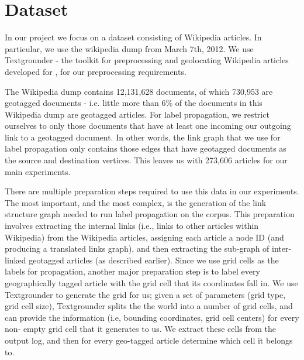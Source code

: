 
\section{Dataset} 
\par In our project we focus on a dataset consisting of
Wikipedia articles. In particular, we use the wikipedia dump from March
7th, 2012. We use Textgrounder - the toolkit for preprocessing and geolocating
Wikipedia articles developed for \cite{wing-baldridge:11}, for our
preprocessing requirements.

\par The Wikipedia dump contains 12,131,628 documents,  of which 730,953 are geotagged documents -
i.e. little more than 6\% of the documents in this Wikipedia dump are
geotagged articles.  For label propagation, we restrict ourselves to only
those documents that have at least one incoming our outgoing link to a
geotagged document. In other words, the link graph that we use for label
propagation only contains those edges that have geotagged documents as the
source and destination vertices. This leaves us with 273,606 articles for our
main experiments.

\par There are multiple preparation steps required to use this data in our
experiments. The most important, and the most complex, is the generation of
the  link structure graph needed to run label propagation on the corpus. This
preparation involves extracting the internal links (i.e., links to other
articles within Wikipedia)  from the Wikipedia articles, assigning each
article a node ID (and producing a translated links  graph), and then
extracting the sub-graph of inter-linked geotagged articles (as  described
earlier). Since we use grid cells as the labels for propagation,  another
major preparation step is to label every geographically tagged article  with
the grid cell that its coordinates fall in. We use Textgrounder to generate the
grid for us;  given a set of parameters (grid type, grid cell size),
Textgrounder splits the the world into a number of grid cells, and can provide
the information (i.e, bounding coordinates, grid cell centers) for every  non-
empty grid cell that it generates to us. We extract these cells from the
output  log, and then for every geo-tagged article determine which cell it
belongs to.


